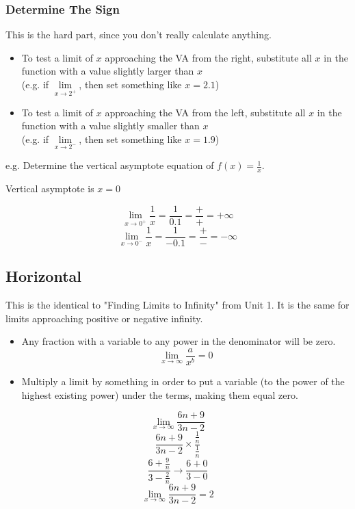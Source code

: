 \documentclass[a4paper,12pt]{article}
\begin{document}
\subsubsection{Determine The Sign}
This is the hard part, since you don't really calculate anything.

\begin{itemize}
    \item{To test a limit of $x$ approaching the VA from the right, substitute all $x$ in the function with a value slightly larger than $x$ \\(e.g. if $\lim\limits_{x \to 2^+}$, then set something like $x = 2.1$)}
    \item{To test a limit of $x$ approaching the VA from the left, substitute all $x$ in the function with a value slightly smaller than $x$ \\(e.g. if $\lim\limits_{x \to 2^-}$, then set something like $x = 1.9$)}
\end{itemize}

e.g. Determine the vertical asymptote equation of $f(x) = \frac{1}{x}$.

Vertical asymptote is $x = 0$

$$\lim\limits_{x \to 0^+}\frac{1}{x} = \frac{1}{0.1} = \frac{+}{+} = +\infty$$
$$\lim\limits_{x \to 0^-}\frac{1}{x} = \frac{1}{-0.1} = \frac{+}{-} = -\infty$$

\pagebreak

\subsection{Horizontal}
This is the identical to "Finding Limits to Infinity" from Unit 1. It is the same for limits approaching positive or negative infinity.

\begin{itemize}
    \item{Any fraction with a variable to any power in the denominator will be zero. $$\lim\limits_{x\to\infty}{\frac{a}{x^b}} = 0$$}
    \item{Multiply a limit by something in order to put a variable (to the power of the highest existing power) under the terms, making them equal zero.}
\end{itemize}

$$\lim\limits_{x\to\infty}{\frac{6n+9}{3n-2}}$$
$$\frac{6n+9}{3n-2} \times \frac{\frac{1}{n}}{\frac{1}{n}}$$
$$\frac{6+\frac{9}{n}}{3-\frac{2}{n}} \longrightarrow \frac{6+0}{3-0}$$
$$\lim\limits_{x\to\infty}{\frac{6n+9}{3n-2}} = 2$$
\end{document}
